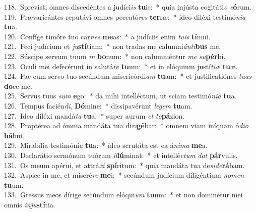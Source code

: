 {118.~}Sprevísti omnes discedéntes a judíci\textit{is} \textbf{tu}is:~* quia injústa cogitáti\textit{o} \textit{e}\textbf{ó}rum.\\
{119.~}Prævaricántes reputávi omnes peccató\textit{res} \textbf{ter}ræ:~* ídeo diléxi testimó\textit{ni}\textit{a} \textbf{tu}a.\\
{120.~}Confíge timóre tuo car\textit{nes} \textbf{me}as:~* a judíciis enim \textit{tu}\textit{is} \textbf{tí}mui.\\
{121.~}Feci judícium et \textit{ju}\textbf{stí}tiam:~* non tradas me calumni\textit{án}\textit{ti}\textbf{bus} me.\\
{122.~}Súscipe servum tuum \textit{in} \textbf{bo}num:~* non calumniéntur \textit{me} \textit{su}\textbf{pér}bi.\\
{123.~}Oculi mei defecérunt in salutá\textit{re} \textbf{tu}um:~* et in elóquium justí\textit{ti}\textit{æ} \textbf{tu}æ.\\
{124.~}Fac cum servo tuo secúndum misericórdi\textit{am} \textbf{tu}am:~* et justificatiónes \textit{tu}\textit{as} \textbf{do}ce me.\\
{125.~}Servus tuus \textit{sum} \textbf{e}go:~* da mihi intelléctum, ut sciam testimó\textit{ni}\textit{a} \textbf{tu}a.\\
{126.~}Tempus facién\textit{di}, \textbf{Dó}mine:~* dissipavérunt \textit{le}\textit{gem} \textbf{tu}am.\\
{127.~}Ideo diléxi mandá\textit{ta} \textbf{tu}a,~* super aurum \textit{et} \textit{to}\textbf{pá}zion.\\
{128.~}Proptérea ad ómnia mandáta tua di\textit{ri}\textbf{gé}bar:~* omnem viam iníquam ó\textit{di}\textit{o} \textbf{há}bui.\\
{129.~}Mirabília testimóni\textit{a} \textbf{tu}a:~* ídeo scrutáta est ea á\textit{ni}\textit{ma} \textbf{me}a.\\
{130.~}Declarátio sermónum tuórum \textit{il}\textbf{lú}minat:~* et intellé\textit{ctum} \textit{dat} \textbf{pár}vulis.\\
{131.~}Os meum apérui, et attrá\textit{xi} \textbf{spí}ritum:~* quia mandáta tua de\textit{si}\textit{de}\textbf{rá}bam.\\
{132.~}Aspice in me, et miseré\textit{re} \textbf{me}i:~* secúndum judícium diligéntium \textit{no}\textit{men} \textbf{tu}um.\\
{133.~}Gressus meos dírige secúndum elóqui\textit{um} \textbf{tu}um:~* et non dominétur mei omnis \textit{in}\textit{ju}\textbf{stí}tia.\\
